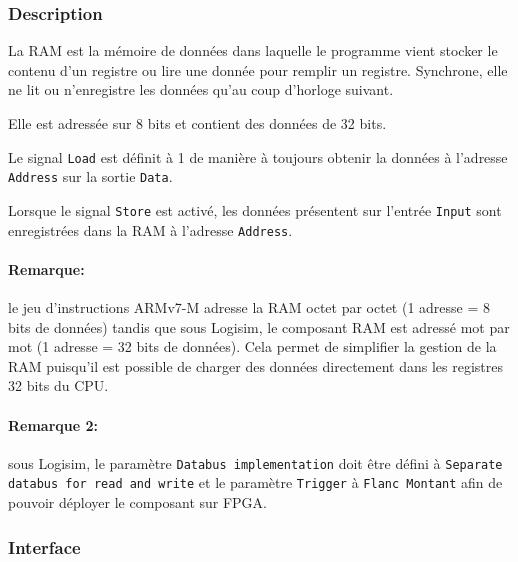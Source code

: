 \documentclass{article}
\begin{document}
    \subsubsection{Description}

    La RAM est la mémoire de données dans laquelle le programme vient stocker le contenu d'un registre ou lire une donnée pour remplir un registre.
    Synchrone, elle ne lit ou n'enregistre les données qu'au coup d'horloge suivant.

    Elle est adressée sur 8 bits et contient des données de 32 bits.

    Le signal \texttt{Load} est définit à 1 de manière à toujours obtenir la données à l'adresse \texttt{Address} sur la sortie \texttt{Data}.

    Lorsque le signal \texttt{Store} est activé, les données présentent sur l'entrée \texttt{Input} sont enregistrées dans la RAM à l'adresse \texttt{Address}.

    \paragraph{Remarque:} le jeu d'instructions ARMv7-M adresse la RAM octet par octet (1 adresse = 8 bits de données) tandis que sous Logisim, le composant RAM est adressé mot par mot (1 adresse = 32 bits de données).
    Cela permet de simplifier la gestion de la RAM puisqu'il est possible de charger des données directement dans les registres 32 bits du CPU.

    \paragraph{Remarque 2:} sous Logisim, le paramètre \texttt{Databus implementation} doit être défini à \texttt{Separate databus for read and write}
    et le paramètre \texttt{Trigger} à \texttt{Flanc Montant} afin de pouvoir déployer le composant sur FPGA.

    \subsubsection{Interface}

\end{document}

